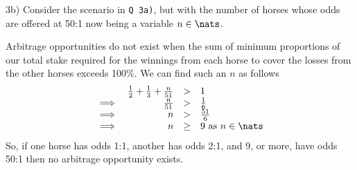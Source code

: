 \documentclass[11pt,a4paper]{article}
\begin{document}
\begin{answer}{3b)}
  Consider the scenario in \texttt{Q 3a)}, but with the number of horses whose odds are offered at 50:1 now being a variable $n\in\nats$.
  \par Arbitrage opportunities do not exist when the sum of minimum proportions of our total stake required for the winnings from each horse to cover the losses from the other horses exceeds 100\%. We can find such an $n$ as follows
  \[\begin{array}{rrcl}
    &\frac12+\frac13+\frac{n}{51}&>&1\\
    \implies&\frac{n}{51}&>&\frac16\\
    \implies&n&>&\frac{51}6\\
    \implies&n&\geq&9\text{ as }n\in\nats
  \end{array}\]
  So, if one horse has odds 1:1, another has odds 2:1, and 9, or more, have odds 50:1 then no arbitrage opportunity exists.
\end{answer}
\end{document}
